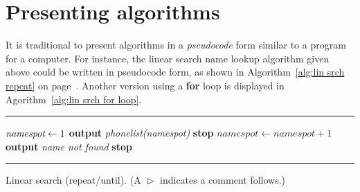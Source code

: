 \section{Presenting algorithms}
It is traditional to present algorithms %
in a \emph{pseudocode} form
similar to a program for a computer. 
For instance, the linear search name lookup algorithm given above could be written 
%
in pseudocode form, as shown in Algorithm~\ref{alg:lin srch repeat} on page~\pageref{alg:lin srch repeat}. Another version using a \textbf{for} loop is displayed in Agorithm~\ref{alg:lin srch for loop}.
\begin{algrthm}
\hrule\kern5pt\relax
\begin{algorithmic}[1]
\State $\text{\itshape namespot}\gets 1$ 
\Repeat {}
    \State \textbf{output} \textit{phonelist(namespot)}
    \State \textbf{stop} 
  \EndIf {}
  \State $namespot \gets namespot+1$ 
 
\State \textbf{output} \textit{name not found}
    \State \textbf{stop}
\end{algorithmic}
\kern2pt\hrule\kern5pt\relax
\caption{Linear search (repeat/until). {(A $\vartriangleright$ \color{blue} indicates a comment follows.)}}\label{alg:lin srch repeat}
\end{algrthm}

